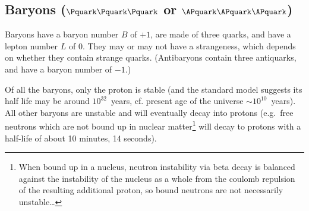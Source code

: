 \subsection{Baryons ($\Pquark\Pquark\Pquark$ or $\APquark\APquark\APquark$)}

Baryons have a baryon number $B$ of $+1$, are made of three quarks, and have a lepton number $L$ of $0$.  They may or may not have a strangeness, which depends on whether they contain strange quarks. (Antibaryons contain three antiquarks, and have a baryon number of $-1$.)

Of all the baryons, only the proton is stable (and the standard model suggests its half life may be around $10^{32}$~years, cf. present age of the universe $\sim 10^{10}$~years).  All other baryons are unstable and will eventually decay into protons (e.g.\ free neutrons which are not bound up in nuclear matter\footnote{When bound up in a nucleus, neutron instability via beta decay is balanced against the instability of the nucleus as a whole from the coulomb repulsion of the resulting additional proton, so bound neutrons are not necessarily unstable\ldots} will decay to protons with a half-life of about 10 minutes, 14 seconds).

